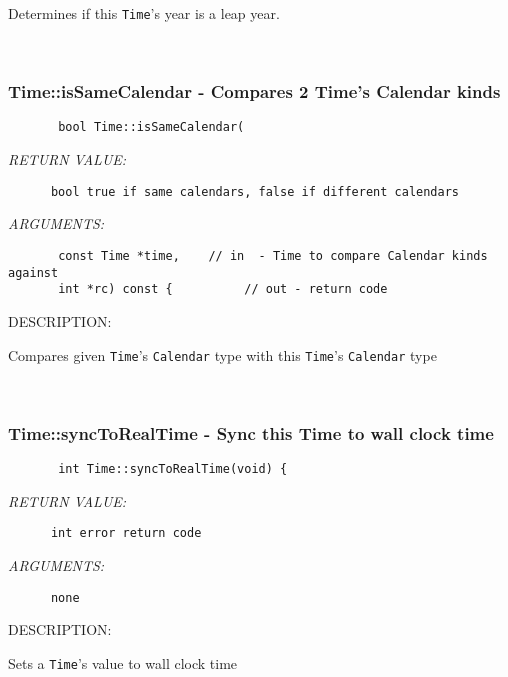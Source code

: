         Determines if this {\tt Time}'s year is a leap year.
   
 
\mbox{}\hrulefill\ 
 
\subsubsection [Time::isSameCalendar] {Time::isSameCalendar - Compares 2 Time's Calendar kinds}


  
\begin{verbatim}       bool Time::isSameCalendar(\end{verbatim}{\em RETURN VALUE:}
\begin{verbatim}      bool true if same calendars, false if different calendars\end{verbatim}{\em ARGUMENTS:}
\begin{verbatim}       const Time *time,    // in  - Time to compare Calendar kinds against
       int *rc) const {          // out - return code\end{verbatim}
{\sf DESCRIPTION:\\ }


        Compares given {\tt Time}'s {\tt Calendar} type with this {\tt Time}'s
        {\tt Calendar} type
   
 
\mbox{}\hrulefill\ 
 
\subsubsection [Time::syncToRealTime] {Time::syncToRealTime - Sync this Time to wall clock time}


  
\begin{verbatim}       int Time::syncToRealTime(void) {\end{verbatim}{\em RETURN VALUE:}
\begin{verbatim}      int error return code\end{verbatim}{\em ARGUMENTS:}
\begin{verbatim}      none\end{verbatim}
{\sf DESCRIPTION:\\ }


        Sets a {\tt Time}'s value to wall clock time
   
